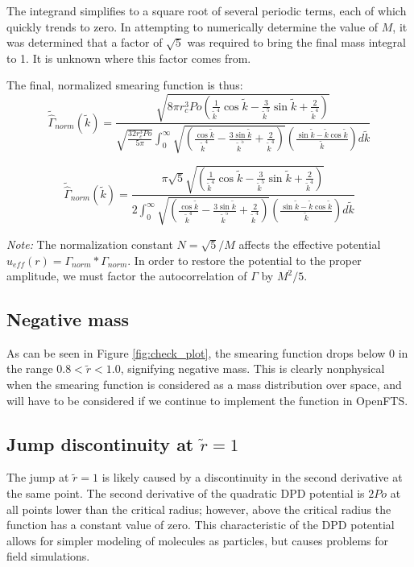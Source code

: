 \documentclass{article}
\begin{document}
The integrand simplifies to a square root of several periodic terms, each of which quickly trends to zero. In attempting to numerically determine the value of \(M\), it was determined that a factor of \(\sqrt{5}\) was required to bring the final mass integral to 1. It is unknown where this factor comes from.

The final, normalized smearing function is thus:
\[\tilde{\hat{\Gamma}}_{norm}(\tilde {k})= \frac{\sqrt{8 \pi r_c^3 Po \left( \frac{1}{\tilde{k}^4}\cos{\tilde{k}} - \frac{3}{\tilde{k}^5} \sin{\tilde{k}} + \frac{2}{\tilde{k}^4} \right)}}{\sqrt{\frac{32r_c^3Po}{5\pi}} \int_0^\infty \sqrt{\left( \frac{\cos \tilde k}{\tilde k^4} - \frac{3 \sin \tilde k}{\tilde k^5} + \frac{2}{\tilde k^4} \right)} \left( \frac{\sin \tilde k - \tilde k \cos \tilde k}{\tilde k} \right) d\tilde k}\]

\begin{equation}
    \boxed{\tilde{\hat{\Gamma}}_{norm}(\tilde {k})= \frac{\pi\sqrt{5}\sqrt{\left( \frac{1}{\tilde{k}^4}\cos{\tilde{k}} - \frac{3}{\tilde{k}^5} \sin{\tilde{k}} + \frac{2}{\tilde{k}^4} \right)}}{2 \int_0^\infty \sqrt{\left( \frac{\cos \tilde k}{\tilde k^4} - \frac{3 \sin \tilde k}{\tilde k^5} + \frac{2}{\tilde k^4} \right)} \left( \frac{\sin \tilde k - \tilde k \cos \tilde k}{\tilde k} \right) d\tilde k}}
    \label{eq:transformed}
 \end{equation}

 \textit{Note:} The normalization constant \(N = \sqrt{5} / M\) affects the effective potential \(u_{eff}(r) = \Gamma_{norm} * \Gamma_{norm}\). In order to restore the potential to the proper amplitude, we must factor the autocorrelation of \(\Gamma\) by \(M^2/5\).
 
\subsection{Negative mass}
As can be seen in Figure \ref{fig:check_plot}, the smearing function drops below 0 in the range \(0.8 < \tilde r < 1.0\), signifying negative mass. This is clearly nonphysical when the smearing function is considered as a mass distribution over space, and will have to be considered if we continue to implement the function in OpenFTS.

\subsection{Jump discontinuity at \(\tilde r = 1\)}
The jump at \(\tilde r = 1\) is likely caused by a discontinuity in the second derivative at the same point. The second derivative of the quadratic DPD potential is \(2 Po\) at all points lower than the critical radius; however, above the critical radius the function has a constant value of zero. This characteristic of the DPD potential allows for simpler modeling of molecules as particles, but causes problems for field simulations.
\end{document}
